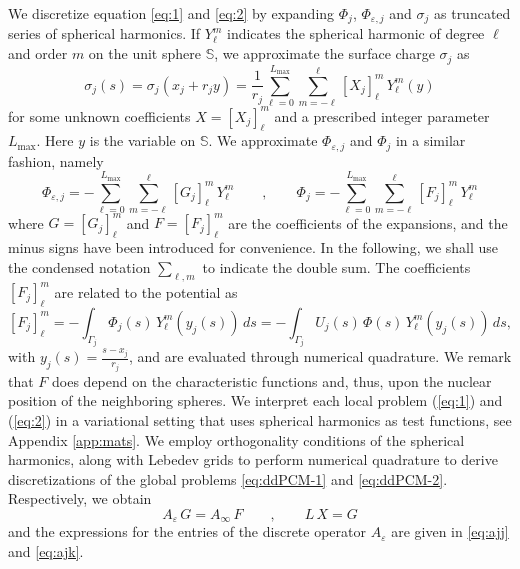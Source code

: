 We discretize equation \eqref{eq:1} and \eqref{eq:2} by expanding $\Phi_j$, $\Phi_{\varepsilon,j}$ and $\sigma_j$ as truncated series of spherical harmonics. If $Y_\ell^m$ indicates the spherical harmonic of degree $\ell$ and order $m$ on the unit sphere $\mathbb{S}$, we approximate the surface charge $\sigma_j$ as
\[
\sigma_j(s) = \sigma_j(x_j + r_j y) = \frac{1}{r_j}\sum_{\ell=0}^{L_\text{max}} \sum_{m = -\ell}^\ell [X_j]_\ell^m \, Y_\ell^m(y)
\]
for some unknown coefficients $X = [X_j]_\ell^m$ and a prescribed integer parameter ${L_\text{max}}$. Here $y$ is the variable on $\mathbb{S}$. %
We approximate $\Phi_{\varepsilon,j}$ and $\Phi_j$ in a similar fashion, namely
\[
\Phi_{\varepsilon,j} = - \sum_{\ell=0}^{L_\text{max}} \sum_{m = -\ell}^\ell [G_j]_\ell^m \, Y_\ell^m \qquad , \qquad \Phi_j = -\sum_{\ell=0}^{L_\text{max}} \sum_{m = -\ell}^\ell [F_j]_\ell^m \, Y_\ell^m
\]
where $G = [G_j]_\ell^m$ and $F = [F_j]_\ell^m$ are the coefficients of the expansions, and the minus signs have been introduced for convenience. In the following, we shall use the condensed notation $\sum_{\ell ,m}$ to indicate the double sum. The coefficients $[F_j]_\ell^m$ are related to the potential as
\begin{equation}\label{eq:25}
[F_j]_\ell^m = - \int_{\Gamma_j} \Phi_j(s) \, Y_\ell^m(y_j(s)) \,ds = - \int_{\Gamma_j} U_j(s) \, \Phi(s) \, Y_\ell^m(y_j(s)) \,ds,
\end{equation}
with $y_j(s)=\tfrac{s-x_j}{r_j}$, 
and are evaluated through numerical quadrature. We remark that $F$ does depend on the characteristic functions and, thus, upon the nuclear position of the neighboring spheres. We interpret each local problem (\ref{eq:1}) and (\ref{eq:2}) in a variational setting that uses spherical harmonics as test functions, see Appendix \ref{app:mats}. We employ orthogonality conditions of the spherical harmonics, along with Lebedev grids to perform numerical quadrature to derive discretizations of the global problems \eqref{eq:ddPCM-1} and \eqref{eq:ddPCM-2}. Respectively, we obtain
\begin{equation}\label{eq:6}
A_\varepsilon \, G = A_\infty \, F \qquad , \qquad  L \, X = G
\end{equation}
and the expressions for the entries of the discrete operator $A_\varepsilon$ are given in \eqref{eq:ajj} and \eqref{eq:ajk}.


